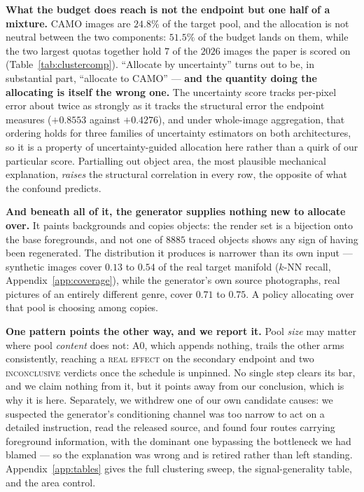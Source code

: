 \documentclass{article}
\begin{document}
\textbf{What the budget does reach is not the endpoint but one half of a mixture.} CAMO images are
$24.8\%$ of the target pool, and the allocation is not neutral between the two components: $51.5\%$
of the budget lands on them, while the two largest quotas together hold $7$ of the $2026$ images the
paper is scored on (Table~\ref{tab:clustercomp}). ``Allocate by uncertainty'' turns out to be, in substantial part, ``allocate
to CAMO'' --- \textbf{and the quantity doing the allocating is itself the wrong one.} The
uncertainty score tracks per-pixel error about twice as strongly as it tracks the structural error
the endpoint measures ($+0.8553$ against $+0.4276$), and under whole-image aggregation, that ordering
holds for three families of uncertainty estimators on both architectures, so it is a property of uncertainty-guided allocation
here rather than a quirk of our particular score. Partialling out object area, the most plausible
mechanical explanation, \emph{raises} the structural correlation in every row, the opposite of what the confound predicts.

\textbf{And beneath all of it, the generator supplies nothing new to allocate over.} It paints
backgrounds and copies objects: the render set is a bijection onto the base foregrounds, and not one
of $8885$ traced objects shows any sign of having been regenerated. The distribution it produces is
narrower than its own input --- synthetic images cover $0.13$ to $0.54$ of the real target manifold
($k$-NN recall, Appendix~\ref{app:coverage}), while the generator's own source photographs, real
pictures of an entirely different genre, cover $0.71$ to $0.75$. A policy allocating over that pool is choosing among copies.

\textbf{One pattern points the other way, and we report it.} Pool \emph{size} may matter where pool
\emph{content} does not: A0, which appends nothing, trails the other arms consistently, reaching a
\textsc{real effect} on the secondary endpoint and two \textsc{inconclusive} verdicts once the
schedule is unpinned. No single step clears its bar, and we claim nothing from it, but it points away
from our conclusion, which is why it is here. Separately, we withdrew one of our own candidate
causes: we suspected the generator's conditioning channel was too narrow to act on a detailed
instruction, read the released source, and found four routes carrying foreground information, with
the dominant one bypassing the bottleneck we had blamed --- so the explanation was wrong and is
retired rather than left standing. Appendix~\ref{app:tables} gives the full clustering sweep, the
signal-generality table, and the area control.
\end{document}
